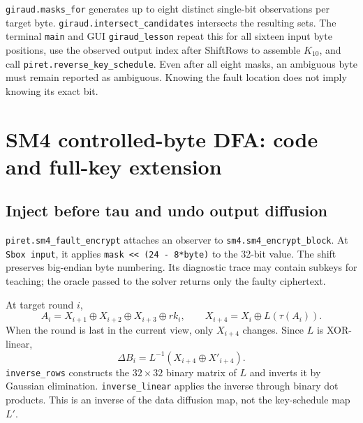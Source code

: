 \documentclass[11pt,a4paper]{report}
\newcommand{\xor}{\mathbin{\oplus}}
\begin{document}
\texttt{giraud.masks\_for} generates up to eight distinct single-bit observations per target byte. \texttt{giraud.intersect\_candidates} intersects the resulting sets. The terminal \texttt{main} and GUI \texttt{giraud\_lesson} repeat this for all sixteen input byte positions, use the observed output index after ShiftRows to assemble $K_{10}$, and call \texttt{piret.reverse\_key\_schedule}. Even after all eight masks, an ambiguous byte must remain reported as ambiguous. Knowing the fault location does not imply knowing its exact bit.

\section{SM4 controlled-byte DFA: code and full-key extension}
\subsection{Inject before tau and undo output diffusion}
\texttt{piret.sm4\_fault\_encrypt} attaches an observer to \texttt{sm4.sm4\_encrypt\_block}. At \texttt{Sbox input}, it applies \texttt{mask << (24 - 8*byte)} to the 32-bit value. The shift preserves big-endian byte numbering. Its diagnostic trace may contain subkeys for teaching; the oracle passed to the solver returns only the faulty ciphertext.

At target round $i$,
\[
A_i=X_{i+1}\xor X_{i+2}\xor X_{i+3}\xor rk_i,
\qquad X_{i+4}=X_i\xor L(\tau(A_i)).
\]
When the round is last in the current view, only $X_{i+4}$ changes. Since $L$ is XOR-linear,
\[
\Delta B_i=L^{-1}(X_{i+4}\xor X'_{i+4}).
\]
\texttt{inverse\_rows} constructs the $32\times32$ binary matrix of $L$ and inverts it by Gaussian elimination. \texttt{inverse\_linear} applies the inverse through binary dot products. This is an inverse of the data diffusion map, not the key-schedule map $L'$.
\end{document}
